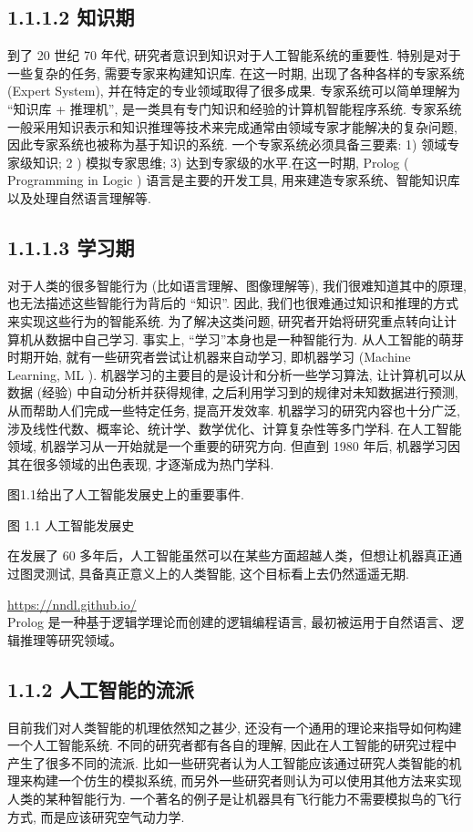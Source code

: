 \documentclass[10pt]{article}
\begin{document}
\subsection*{1.1.1.2 知识期}
到了 20 世纪 70 年代, 研究者意识到知识对于人工智能系统的重要性. 特别是对于一些复杂的任务, 需要专家来构建知识库. 在这一时期, 出现了各种各样的专家系统 (Expert System), 并在特定的专业领域取得了很多成果. 专家系统可以简单理解为 “知识库 + 推理机”, 是一类具有专门知识和经验的计算机智能程序系统. 专家系统一般采用知识表示和知识推理等技术来完成通常由领域专家才能解决的复杂问题, 因此专家系统也被称为基于知识的系统. 一个专家系统必须具备三要素: 1) 领域专家级知识; 2 ) 模拟专家思维; 3) 达到专家级的水平.在这一时期, Prolog ( Programming in Logic ) 语言是主要的开发工具, 用来建造专家系统、智能知识库以及处理自然语言理解等.

\subsection*{1.1.1.3 学习期}
对于人类的很多智能行为 (比如语言理解、图像理解等), 我们很难知道其中的原理, 也无法描述这些智能行为背后的 “知识”. 因此, 我们也很难通过知识和推理的方式来实现这些行为的智能系统. 为了解决这类问题, 研究者开始将研究重点转向让计算机从数据中自己学习. 事实上, “学习”本身也是一种智能行为. 从人工智能的萌芽时期开始, 就有一些研究者尝试让机器来自动学习, 即机器学习 (Machine Learning, ML ). 机器学习的主要目的是设计和分析一些学习算法, 让计算机可以从数据 (经验) 中自动分析并获得规律, 之后利用学习到的规律对未知数据进行预测, 从而帮助人们完成一些特定任务, 提高开发效率. 机器学习的研究内容也十分广泛, 涉及线性代数、概率论、统计学、数学优化、计算复杂性等多门学科. 在人工智能领域, 机器学习从一开始就是一个重要的研究方向. 但直到 1980 年后, 机器学习因其在很多领域的出色表现, 才逐渐成为热门学科.

图1.1给出了人工智能发展史上的重要事件.



图 1.1 人工智能发展史

在发展了 60 多年后，人工智能虽然可以在某些方面超越人类，但想让机器真正通过图灵测试, 具备真正意义上的人类智能, 这个目标看上去仍然遥遥无期.

\href{https://nndl.github.io/}{https://nndl.github.io/}\\
Prolog 是一种基于逻辑学理论而创建的逻辑编程语言, 最初被运用于自然语言、逻辑推理等研究领域。

\subsection*{1.1.2 人工智能的流派}
目前我们对人类智能的机理依然知之甚少, 还没有一个通用的理论来指导如何构建一个人工智能系统. 不同的研究者都有各自的理解, 因此在人工智能的研究过程中产生了很多不同的流派. 比如一些研究者认为人工智能应该通过研究人类智能的机理来构建一个仿生的模拟系统, 而另外一些研究者则认为可以使用其他方法来实现人类的某种智能行为. 一个著名的例子是让机器具有飞行能力不需要模拟鸟的飞行方式, 而是应该研究空气动力学.
\end{document}
